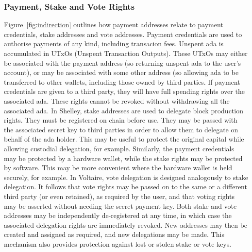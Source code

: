 \subsubsection*{Payment, Stake and Vote Rights}

Figure~\ref{fig:indirection} outlines how payment addresses relate to payment credentials, stake addresses  and vote addresses.  Payment credentials are used to
authorise payments of any kind, including transacion fees.  Unspent ada is accumulated in UTxOs (Unspent Transaction Outputs).  These UTxOs may either be associated
with the payment address (so returning unspent ada to the user's account), or may be associated with some other address (so allowing ada to be transferred to other wallets,
including those owned by third parties.  If payment credentials are given to a third party, they will have full spending rights over the associated ada.  These rights cannot be
revoked without withdrawing all the associated ada. 
In Shelley, stake addresses are used to delegate block production rights.  They must be registered on chain before use.  They may be passed with the associated secret key to third parties
in order to allow them to delegate on behalf of the ada holder.  This may be useful to protect the original capital while allowing custodial delegation, for example.  Similarly,
the payment credentials may be protected by a hardware wallet, while the stake rights may be protected by software.  This may be more convenient where the hardware wallet is
held securely, for example.
In Voltaire, vote delegation is designed analogously to stake delegation.  It follows that vote rights may be passed on to the same or a different third party (or even retained), as required by the user,
and that voting rights may be asserted without needing the secret payment key.  Both stake and vote addresses may be independently de-registered at any time, in which case the associated delegation rights are immediately
revoked.  New addresses may then be created and assigned as required, and new delegations may be made.  This mechanism also provides protection against lost or stolen stake or vote keys.

